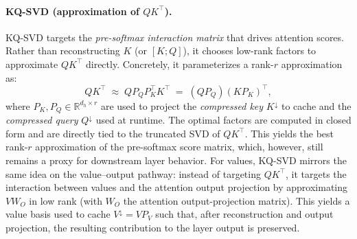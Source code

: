 \paragraph{KQ-SVD (approximation of $QK^\top$).}
KQ-SVD \citep{lesens2025kqsvd} targets the \emph{pre-softmax interaction matrix} that drives attention scores.
Rather than reconstructing $K$ (or $[K;Q]$), it chooses low-rank factors to approximate $QK^\top$ directly.
Concretely, it parameterizes a rank-$r$ approximation as:
\begin{equation}
QK^\top \;\approx\; Q P_Q P_K^\top K^\top \;=\; (Q P_Q)(K P_K)^\top,
\label{eq:bg_kqsvd_form}
\end{equation}
where $P_K,P_Q\in\mathbb{R}^{d_h\times r}$ are used to project the \emph{compressed key} $K^{\downarrow}$ to cache and the \emph{compressed query} $Q^{\downarrow}$ used at runtime.
The optimal factors are computed in closed form and are directly tied to the truncated SVD of $QK^\top$.
This yields the best rank-$r$ approximation of the pre-softmax score matrix, which, however, still remains a proxy for downstream layer behavior. For values, KQ-SVD mirrors the same idea on the value--output pathway: instead of targeting $QK^\top$, it targets the interaction between values and the attention output projection by approximating $V W_O$ in low rank (with $W_O$ the attention output-projection matrix).
This yields a value basis used to cache $V^{\downarrow}=V P_V$ such that, after reconstruction and output projection, the resulting contribution to the layer output is preserved.

